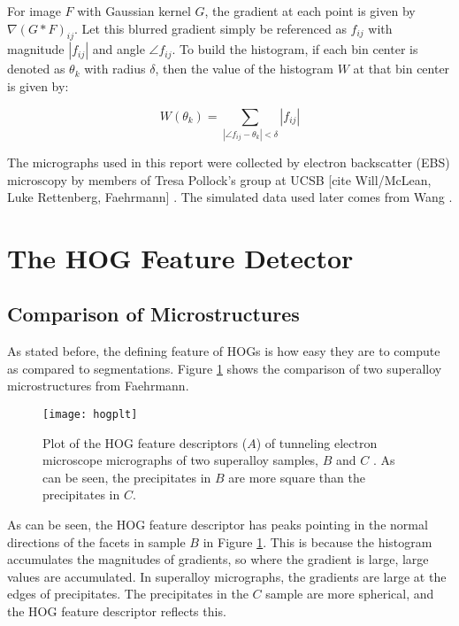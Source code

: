 \documentclass[review]{elsarticle}
\begin{document}
	For image $F$ with Gaussian kernel $G$, the gradient at each point is given by $\nabla \left( G \ast F \right)_{ij}$. Let this blurred gradient simply be referenced as $f_{ij}$ with magnitude $\left| f_{ij} \right|$ and angle $\angle f_{ij}$. To build the histogram, if each bin center is denoted as $\theta_k$ with radius $\delta$, then the value of the histogram $W$ at that bin center is given by:

	\begin{equation}
		W \left( \theta_k \right) = \sum_{\left| \angle f_{ij} - \theta_k \right| < \delta} \left| f_{ij} \right|
	\end{equation}

	The micrographs used in this report were collected by electron backscatter (EBS) microscopy by members of Tresa Pollock's group at UCSB [cite Will/McLean, Luke Rettenberg, Faehrmann] \cite{tribeam}. The simulated data used later comes from Wang \cite{ywang2}.

	\section{The HOG Feature Detector}
	\subsection{Comparison of Microstructures}
	As stated before, the defining feature of HOGs is how easy they are to compute as compared to segmentations. Figure \ref{figure2} shows the comparison of two superalloy microstructures from Faehrmann\cite{molly}.

	\begin{figure}[!ht]
  		\centering
    	\texttt{[image: hogplt]}
  		\caption{ Plot of the HOG feature descriptors ($A$) of tunneling electron microscope micrographs of two superalloy samples, $B$ and $C$ \cite{molly}. As can be seen, the precipitates in $B$ are more square than the precipitates in $C$. }
  		\label{figure2}
	\end{figure}

	As can be seen, the HOG feature descriptor has peaks pointing in the normal directions of the facets in sample $B$ in Figure \ref{figure2}. This is because the histogram accumulates the magnitudes of gradients, so where the gradient is large, large values are accumulated. In superalloy micrographs, the gradients are large at the edges of precipitates. The precipitates in the $C$ sample are more spherical, and the HOG feature descriptor reflects this.
	
\end{document}
